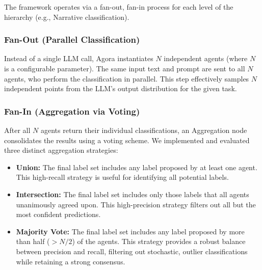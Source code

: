 The framework operates via a fan-out, fan-in process for each level of the hierarchy (e.g., Narrative classification).

\subsubsection{Fan-Out (Parallel Classification)}

Instead of a single LLM call, Agora instantiates $N$ independent agents (where $N$ is a configurable parameter). The same input text and prompt are sent to all $N$ agents, who perform the classification in parallel. This step effectively samples $N$ independent points from the LLM's output distribution for the given task.

\subsubsection{Fan-In (Aggregation via Voting)}

After all $N$ agents return their individual classifications, an Aggregation node consolidates the results using a voting scheme. We implemented and evaluated three distinct aggregation strategies:

\begin{itemize}
\item \textbf{Union:} The final label set includes any label proposed by at least one agent. This high-recall strategy is useful for identifying all potential labels.

\item \textbf{Intersection:} The final label set includes only those labels that all agents unanimously agreed upon. This high-precision strategy filters out all but the most confident predictions.

\item \textbf{Majority Vote:} The final label set includes any label proposed by more than half ($> N/2$) of the agents. This strategy provides a robust balance between precision and recall, filtering out stochastic, outlier classifications while retaining a strong consensus.
\end{itemize}

